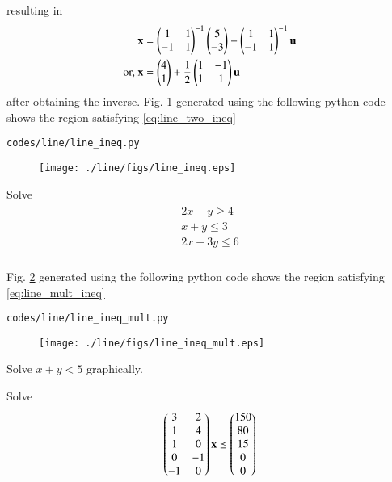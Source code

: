 %
resulting in 
\begin{align}
\mathbf{x} &= \begin{pmatrix}1 & 1 \\ -1 & 1\end{pmatrix}^{-1}\begin{pmatrix}5\\-3\end{pmatrix} +\begin{pmatrix}1 & 1 \\ -1 & 1\end{pmatrix}^{-1}\mathbf{u}
\\
\text{or, } \mathbf{x} &= \begin{pmatrix}4\\1\end{pmatrix} +\frac{1}{2}\begin{pmatrix}1 & -1 \\ 1 & 1\end{pmatrix}\mathbf{u}
\end{align}
%
after obtaining the  inverse.
%
 Fig. \ref{fig:line_ineq} generated using the following python code shows the region satisfying \eqref{eq:line_two_ineq}

\begin{lstlisting}
codes/line/line_ineq.py
\end{lstlisting}
%
\begin{figure}[!ht]
\texttt{[image: ./line/figs/line\_ineq.eps]}
\caption{}
\label{fig:line_ineq}
\end{figure}
%
\item Solve 
\begin{align}
\begin{split}
2x+y \geq 4
\\ 
x+y \leq 3
\\ 
2x-3y \leq 6
\end{split}
\label{eq:line_mult_ineq}
\end{align}
%
\\
\solution  Fig. \ref{fig:line_ineq_mult} generated using the following python code shows the region satisfying \eqref{eq:line_mult_ineq}

\begin{lstlisting}
codes/line/line_ineq_mult.py
\end{lstlisting}
%
\begin{figure}[!ht]
\texttt{[image: ./line/figs/line\_ineq\_mult.eps]}
\caption{}
\label{fig:line_ineq_mult}
\end{figure}
%
\item   Solve    $x+y < 5$ graphically.
\\
\solution 

%
    \item Solve 
\begin{align}
\begin{pmatrix}3 & 2 \\ 1 & 4 \\ 1 & 0 \\ 0 & -1 \\ -1 & 0\end{pmatrix} \mathbf{x}\preceq \begin{pmatrix}150\\80\\15\\0\\0\end{pmatrix}
\end{align}
%
   
